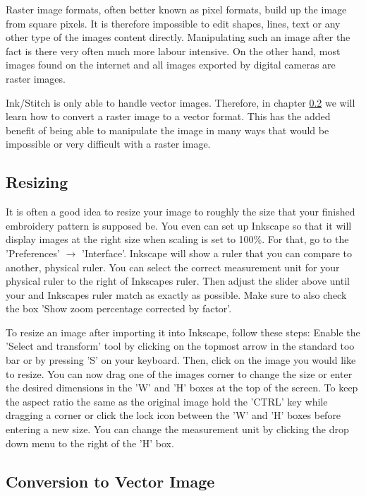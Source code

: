 \documentclass{article}
\begin{document}
                Raster image formats, often better known as pixel formats, build up the image from square pixels. It is therefore impossible to edit shapes, lines, text or any other type of the images content directly.
                Manipulating such an image after the fact is there very often much more labour intensive. On the other hand, most images found on the internet and all images exported by digital cameras are raster images.

                Ink/Stitch is only able to handle vector images. Therefore, in chapter \ref{vectorConversion}  we will learn how to convert a raster image to a vector format.
                This has the added benefit of being able to manipulate the image in many ways that would be impossible or very difficult with a raster image.

        \subsection{Resizing}

        It is often a good idea to resize your image to roughly the size that your finished embroidery pattern is supposed be.
        You even can set up Inkscape so that it will display images at the right size when scaling is set to 100\%. For that, go to the 'Preferences' $\rightarrow$ 'Interface'.
        Inkscape will show a ruler that you can compare to another, physical ruler. You can select the correct measurement unit for your physical ruler to the right of Inkscapes ruler. Then adjust the slider above until your and Inkscapes ruler match as exactly as possible.
        Make sure to also check the box 'Show zoom percentage corrected by factor'.

        To resize an image after importing it into Inkscape, follow these steps:
        Enable the 'Select and transform' tool by clicking on the topmost arrow in the standard too bar or by pressing 'S' on your keyboard.
        Then, click on the image you would like to resize. You can now drag one of the images corner to change the size or enter the desired dimensions in the 'W' and 'H' boxes at the top of the screen.
        To keep the aspect ratio the same as the original image hold the 'CTRL' key while dragging a corner or click the lock icon between the 'W' and 'H' boxes before entering a new size.
        You can change the measurement unit by clicking the drop down menu to the right of the 'H' box.

        \subsection{Conversion to Vector Image} \label{vectorConversion}
\end{document}

